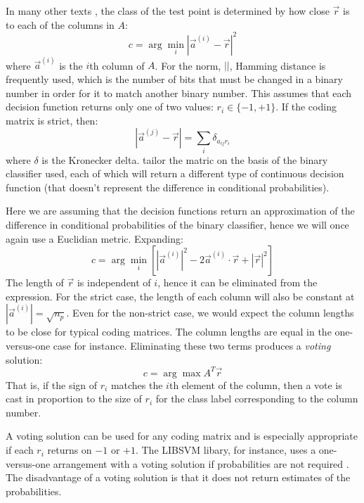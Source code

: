 \documentclass{article}
\begin{document}
In many other texts \citep{Allwein_etal2000, Hsu_Lin2002, Dietterich_Bakiri1995},
the class of the test point is determined by how close $\vec r$
is to each of the columns in $A$:
\begin{equation}
	c = \arg \min_i |\vec a^{(i)} - \vec r|^2
\end{equation}
where $\vec a^{(i)}$ is the $i$th column of $A$.
For the norm, $||$, Hamming distance is
frequently used, which is the number of bits that must be changed
in a binary number in order for it to match another binary number.
This assumes that each decision function returns only one of two values: 
$r_i \in \lbrace -1, +1 \rbrace$.
If the coding matrix is strict, then:
\begin{equation}
	|\vec a^{(j)} - \vec r| = \sum_i \delta_{a_{ij} r_i}
\end{equation}
where $\delta$ is the Kronecker delta.
\citet{Allwein_etal2000} 
tailor the matric on the basis of the binary classifier used, each of which
will return a different type of continuous decision function 
(that doesn't represent the difference in conditional probabilities).

Here we are assuming that the decision functions return an approximation of the 
difference in conditional probabilities of the binary classifier, hence we will once again use a
Euclidian metric. Expanding:
\begin{equation}
	c = \arg \min_i \left [|\vec a^{(i)}|^2 - 2 \vec a^{(i)} \cdot \vec r + |\vec r|^2 \right ]
\end{equation}
The length of $\vec r$ is independent of $i$, hence it can be eliminated from the expression.
For the strict case, the length of each column will also be constant at $|\vec a^{(i)}|=\sqrt{n_p}$.
Even for the non-strict case, we would expect the column lengths to be close for typical coding 
matrices. The column lengths are equal in the one-versus-one case for instance.
Eliminating these two terms produces a {\it voting} solution:
\begin{equation}
	c = \arg \max A^T \vec r
\end{equation}
That is, if the sign of $r_i$ matches the $i$th element of the column, then a vote is cast 
in proportion to the size of $r_i$ for the class label corresponding to the column number.

A voting solution can be used for any coding matrix and 
is especially appropriate if each $r_i$ returns on $-1$ or $+1$.  
The LIBSVM libary, for instance, uses a one-versus-one arrangement with a voting
solution if probabilities are not required \citep{Chang_Lin2011}.
The disadvantage of a voting solution is
that it does not return estimates of the probabilities.
\end{document}
